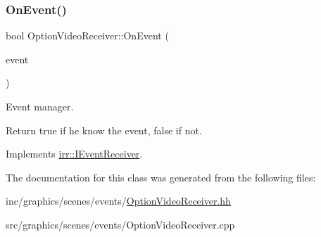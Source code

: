\subsubsection{\texorpdfstring{On\+Event()}{OnEvent()}}
{\footnotesize\ttfamily bool Option\+Video\+Receiver\+::\+On\+Event (\begin{DoxyParamCaption}\item[{const \hyperlink{structirr_1_1SEvent}{irr\+::\+S\+Event} \&}]{event }\end{DoxyParamCaption})\hspace{0.3cm}{\ttfamily [virtual]}}



Event manager. 

Return true if he know the event, false if not. 

Implements \hyperlink{classirr_1_1IEventReceiver_a571f744ceffc3b4fe8a81f529163eb97}{irr\+::\+I\+Event\+Receiver}.



The documentation for this class was generated from the following files\+:\begin{DoxyCompactItemize}
\item 
inc/graphics/scenes/events/\hyperlink{OptionVideoReceiver_8hh}{Option\+Video\+Receiver.\+hh}\item 
src/graphics/scenes/events/Option\+Video\+Receiver.\+cpp\end{DoxyCompactItemize}
